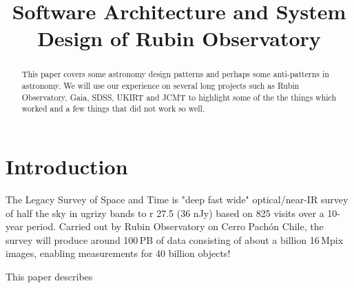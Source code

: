 \documentclass[11pt,twoside]{article}
\begin{document}

\title{Software Architecture and System Design of Rubin Observatory}







\begin{abstract}
This paper covers some astronomy design patterns and perhaps some anti-patterns in astronomy. We will use our experience on several long projects such as Rubin Observatory, Gaia, SDSS,  UKIRT and JCMT to highlight some of the the things which worked and a few things that did not work so well.
\end{abstract}

\section{Introduction}

The Legacy Survey of Space and Time \citep{2019ApJ...873..111I} is "deep fast wide" optical/near-IR survey of half the sky in ugrizy bands to r 27.5 (36 nJy) based on 825 visits over a 10-year period.
Carried out by Rubin Observatory on Cerro Pach\'{o}n Chile, the survey will produce around 100\,PB of data consisting of about a billion 16\,Mpix images, enabling measurements for 40 billion objects!

This paper describes



\end{document}
